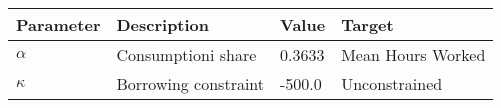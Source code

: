 \begin{tabular}{l l l l} 
\hline 
Parameter & Description & Value & Target \\ 
\hline 
$\alpha$ & Consumptioni share & 0.3633 & Mean Hours Worked \\ 
$\kappa$ & Borrowing constraint & -500.0 & Unconstrained \\ 
\hline 
\end{tabular}